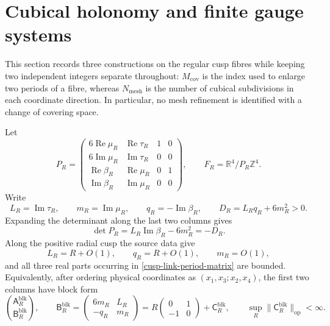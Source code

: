 
\section{Cubical holonomy and finite gauge systems}
\label{cusp-link-section}

This section records three constructions on the regular cusp fibres while
keeping two independent integers separate throughout:
\(M_{\mathrm{cov}}\) is the index used to enlarge two periods of a fibre,
whereas \(N_{\mathrm{mesh}}\) is the number of cubical subdivisions in each
coordinate direction.  In particular, no mesh refinement is identified with
a change of covering space.

Let
\begin{equation}
 P_R=
 \begin{pmatrix}
  6\operatorname{Re}\mu_R&\operatorname{Re}\tau_R&1&0\\
  6\operatorname{Im}\mu_R&\operatorname{Im}\tau_R&0&0\\
  \operatorname{Re}\beta_R&\operatorname{Re}\mu_R&0&1\\
  \operatorname{Im}\beta_R&\operatorname{Im}\mu_R&0&0
 \end{pmatrix},
 \qquad
 F_R=\mathbb R^4/P_R\mathbb Z^4.
 \label{cusp-link-period-matrix}
\end{equation}
Write
\begin{equation}
 L_R=\operatorname{Im}\tau_R,
 \qquad m_R=\operatorname{Im}\mu_R,
 \qquad q_R=-\operatorname{Im}\beta_R,
 \qquad D_R=L_Rq_R+6m_R^2>0.
 \label{cusp-link-radial-data}
\end{equation}
Expanding the determinant along the last two columns gives
\[
 \det P_R=L_R\operatorname{Im}\beta_R-6m_R^2=-D_R.
\]
Along the positive radial cusp the source data give
\begin{equation}
 L_R=R+O(1),\qquad q_R=R+O(1),\qquad m_R=O(1),
 \label{cusp-link-cusp-asymptotics}
\end{equation}
and all three real parts occurring in \eqref{cusp-link-period-matrix} are
bounded.  Equivalently, after ordering physical coordinates as
\((x_1,x_3;x_2,x_4)\), the first two columns have block form
\begin{equation}
\binom{\mathsf A_R^{\mathrm{blk}}}{\mathsf B_R^{\mathrm{blk}}},\qquad
\mathsf B_R^{\mathrm{blk}}=
\begin{pmatrix}6m_R&L_R\\-q_R&m_R\end{pmatrix}
=R\begin{pmatrix}0&1\\-1&0\end{pmatrix}
 +\mathsf C_R^{\mathrm{blk}},
\qquad \sup_R\lVert \mathsf C_R^{\mathrm{blk}}\rVert_{\mathrm{op}}<\infty.
 \label{cusp-link-block-form}
\end{equation}

